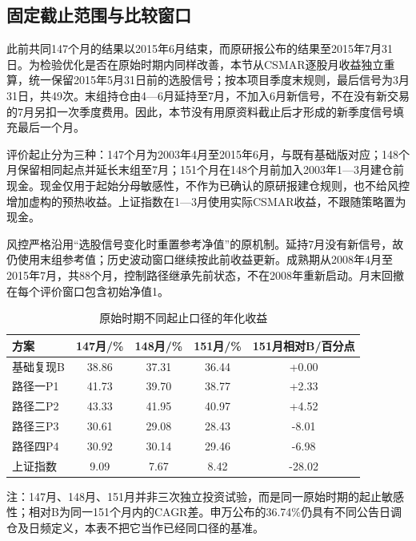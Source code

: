 \subsection{固定截止范围与比较窗口}
此前共同147个月的结果以2015年6月结束，而原研报公布的结果至2015年7月31日。为检验优化是否在原始时期内同样改善，本节从CSMAR逐股月收益独立重算，统一保留2015年5月31日前的选股信号；按本项目季度末规则，最后信号为3月31日，共49次。末组持仓由4—6月延持至7月，不加入6月新信号，不在没有新交易的7月另扣一次季度费用。因此，本节没有用原资料截止后才形成的新季度信号填充最后一个月。

评价起止分为三种：147个月为2003年4月至2015年6月，与既有基础版对应；148个月保留相同起点并延长末组至7月；151个月在148个月前加入2003年1—3月建仓前现金。现金仅用于起始分母敏感性，不作为已确认的原研报建仓规则，也不给风控增加虚构的预热收益。上证指数在1—3月使用实际CSMAR收益，不跟随策略置为现金。

风控严格沿用“选股信号变化时重置参考净值”的原机制。延持7月没有新信号，故仍使用末组参考值；历史波动窗口继续按此前收益更新。成熟期从2008年4月至2015年7月，共88个月，控制路径继承先前状态，不在2008年重新启动。月末回撤在每个评价窗口包含初始净值1。

\begin{table}[htbp]
\centering
\caption{原始时期不同起止口径的年化收益}
\renewcommand{\arraystretch}{1.18}
\small
\setlength{\tabcolsep}{4.5pt}
\begin{tabularx}{\textwidth}{@{}p{2.55cm}*{4}{C}@{}}
\toprule
方案 & 147月/\% & 148月/\% & 151月/\% & 151月相对B/百分点 \\
\midrule
基础复现B & 38.86 & 37.31 & 36.44 & +0.00 \\
路径一P1 & 41.73 & 39.70 & 38.77 & +2.33 \\
路径二P2 & 43.33 & 41.95 & 40.97 & +4.52 \\
路径三P3 & 30.61 & 29.08 & 28.43 & -8.01 \\
路径四P4 & 30.92 & 30.14 & 29.46 & -6.98 \\
上证指数 & 9.09 & 7.67 & 8.42 & -28.02 \\
\bottomrule
\end{tabularx}
\par\smallskip
\begin{minipage}{\textwidth}\small 注：147月、148月、151月并非三次独立投资试验，而是同一原始时期的起止敏感性；相对B为同一151个月内的CAGR差。申万公布的36.74\%仍具有不同公告日调仓及日频定义，本表不把它当作已经同口径的基准。\end{minipage}
\end{table}

